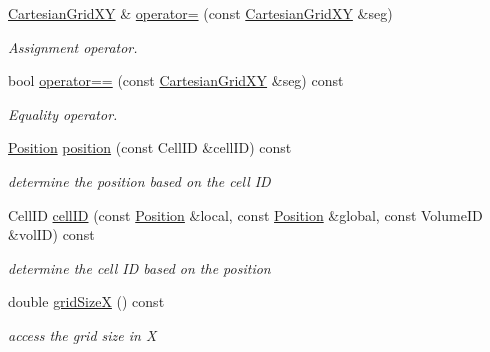 \begin{DoxyCompactItemize}
\hyperlink{class_d_d4hep_1_1_geometry_1_1_cartesian_grid_x_y}{CartesianGridXY} \& \hyperlink{class_d_d4hep_1_1_geometry_1_1_cartesian_grid_x_y_aa93e75d1fc33ccb737f0eb345aa3581a}{operator=} (const \hyperlink{class_d_d4hep_1_1_geometry_1_1_cartesian_grid_x_y}{CartesianGridXY} \&seg)
\begin{DoxyCompactList}\small\item\em Assignment operator. \item\end{DoxyCompactList}\item 
bool \hyperlink{class_d_d4hep_1_1_geometry_1_1_cartesian_grid_x_y_af5cf0fdf544e007c8ed2eba569e1f61c}{operator==} (const \hyperlink{class_d_d4hep_1_1_geometry_1_1_cartesian_grid_x_y}{CartesianGridXY} \&seg) const 
\begin{DoxyCompactList}\small\item\em Equality operator. \item\end{DoxyCompactList}\item 
\hyperlink{namespace_d_d4hep_1_1_geometry_a55083902099d03506c6db01b80404900}{Position} \hyperlink{class_d_d4hep_1_1_geometry_1_1_cartesian_grid_x_y_aeac0022c94fc5d1d678e2189bde347eb}{position} (const CellID \&cellID) const 
\begin{DoxyCompactList}\small\item\em determine the position based on the cell ID \item\end{DoxyCompactList}\item 
CellID \hyperlink{class_d_d4hep_1_1_geometry_1_1_cartesian_grid_x_y_a1d4eb67f1922ce37e737d63199ecfb54}{cellID} (const \hyperlink{namespace_d_d4hep_1_1_geometry_a55083902099d03506c6db01b80404900}{Position} \&local, const \hyperlink{namespace_d_d4hep_1_1_geometry_a55083902099d03506c6db01b80404900}{Position} \&global, const VolumeID \&volID) const 
\begin{DoxyCompactList}\small\item\em determine the cell ID based on the position \item\end{DoxyCompactList}\item 
double \hyperlink{class_d_d4hep_1_1_geometry_1_1_cartesian_grid_x_y_ab5230ec655340600fd4dd452a4188a3c}{gridSizeX} () const 
\begin{DoxyCompactList}\small\item\em access the grid size in X \item\end{DoxyCompactList}\item 

\end{DoxyCompactItemize}
